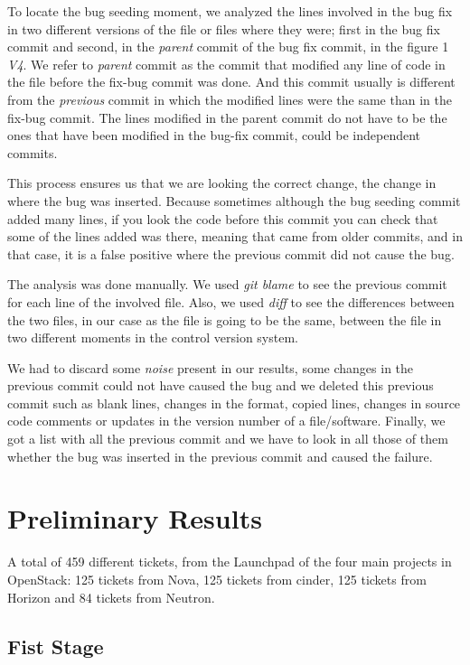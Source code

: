 \documentclass[ifip]{svmult}
\begin{document}
To locate the bug seeding moment, we analyzed the lines involved in the bug fix in two different versions of the file or files where they were; first in the bug fix commit and second, in the \emph{parent} commit of the bug fix commit, in the figure 1 \textit{V4}. We refer to \emph{parent} commit as the commit that modified any line of code in the file before the fix-bug commit was done. And this commit usually is different from the \emph{previous} commit in which the modified lines were the same than in the fix-bug commit. The lines modified in the parent commit do not have to be the ones that have been modified in the bug-fix commit, could be independent commits.

This process ensures us that we are looking the correct change, the change in where the bug was inserted. Because sometimes although the bug seeding commit added many lines, if you look the code before this commit you can check that some of the lines added was there, meaning that came from older commits, and in that case, it is a false positive where the previous commit did not cause the bug. 

The analysis was done manually. We used \textit{git blame} to see the previous commit for each line of the involved file. Also, we used \textit{diff} to see the differences between the two files, in our case as the file is going to be the same, between the file in two different moments in the control version system.

We had to discard some \emph{noise} present in our results, some changes in the previous commit could not have caused the bug and we deleted this previous commit such as blank lines, changes in the format, copied lines, changes in source code comments or updates in the version number of a file/software. Finally, we got a list with all the previous commit and we have to look in all those of them whether the bug was inserted in the previous commit and caused the failure.
\section{Preliminary Results}
\label{sec:results}

A total of 459 different tickets, from the Launchpad of the four main projects in OpenStack: 125 tickets from Nova, 125 tickets from cinder, 125 tickets from Horizon and 84 tickets from Neutron.

\subsection{Fist Stage}
\label{sec:resultsFS}
\end{document}
